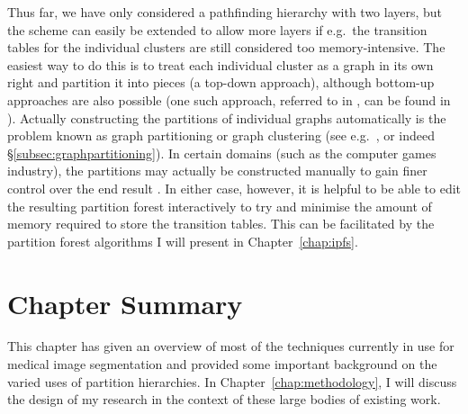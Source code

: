 Thus far, we have only considered a pathfinding hierarchy with two layers, but the scheme can easily be extended to allow more layers if e.g.~the transition tables for the individual clusters are still considered too memory-intensive. The easiest way to do this is to treat each individual cluster as a graph in its own right and partition it into pieces (a top-down approach), although bottom-up approaches are also possible (one such approach, referred to in \cite{kim98}, can be found in \cite{jing96}). Actually constructing the partitions of individual graphs automatically is the problem known as graph partitioning or graph clustering (see e.g.~\cite{huang96,jing98}, or indeed \S\ref{subsec:graphpartitioning}). In certain domains (such as the computer games industry), the partitions may actually be constructed manually to gain finer control over the end result \cite{dickheiser04}. In either case, however, it is helpful to be able to edit the resulting partition forest interactively to try and minimise the amount of memory required to store the transition tables. This can be facilitated by the partition forest algorithms I will present in Chapter~\ref{chap:ipfs}.


\section{Chapter Summary}

This chapter has given an overview of most of the techniques currently in use for medical image segmentation and provided some important background on the varied uses of partition hierarchies. In Chapter~\ref{chap:methodology}, I will discuss the design of my research in the context of these large bodies of existing work.

